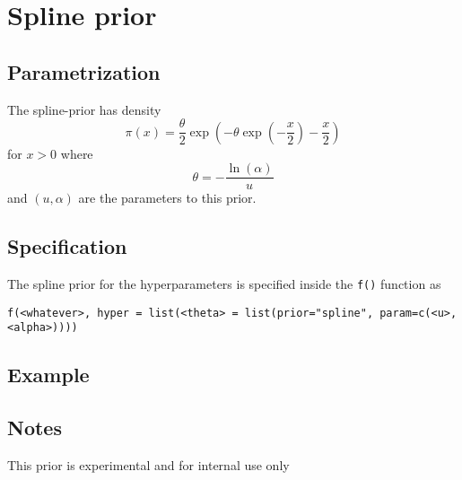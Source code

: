 \documentclass[a4paper,11pt]{article}
\begin{document}
\section*{Spline prior}

\subsection*{Parametrization}
The spline-prior has density 
\begin{equation}
    \pi(x) = \frac{\theta}{2} \exp\left(
      -\theta\exp\left(-\frac{x}{2}\right) - \frac{x}{2}
    \right)
\end{equation}
for $x>0$ where
\begin{displaymath}
    \theta = -\frac{\ln(\alpha)}{u}
\end{displaymath}
and $(u, \alpha{})$ are the parameters to this prior. 

\subsection*{Specification}
The spline prior for the hyperparameters is specified inside the
{\tt f()} function as 
\begin{center}
    {\tt f(<whatever>, hyper = list(<theta> =
        list(prior="spline", param=c(<u>,<alpha>))))}
\end{center}

\subsection*{Example}

\subsection*{Notes}
This prior is experimental and for internal use only
\end{document}
